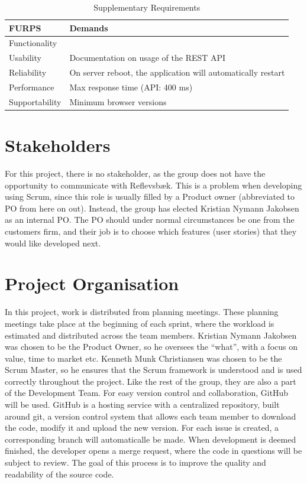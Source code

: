 \begin{table}[ht]
    \begin{tabularx}{\textwidth}{|>{\RaggedRight}p{4cm}|>{\RaggedRight}X|}
        \hline
        \textbf{FURPS}  & \textbf{Demands} \\
        \hline
        Functionality  	&  \\
        \hline
        Usability      	& Documentation on usage of the REST API \\
        \hline
        Reliability    	& On server reboot, the application will automatically restart \\
        \hline
        Performance    	& Max response time (API: 400 ms) \\
        \hline
        Supportability 	& Minimum browser versions \\
        \hline
    \end{tabularx}
    \caption{Supplementary Requirements} 
    \label{table:Sup_requirements}
\end{table} 

\section{Stakeholders}
For this project, there is no stakeholder, as the group does not have the
opportunity to communicate with Reflevsbæk. This is a problem when developing
using Scrum, since this role is usually filled by a Product owner (abbreviated
to PO from here on out). Instead, the group has elected Kristian Nymann 
Jakobsen as an internal PO. The PO should under normal circumstances be one
from the customers firm, and their job is to choose which features (user
stories) that they would like developed next.

\section{Project Organisation}
In this project, work is distributed from planning meetings. These planning
meetings take place at the beginning of each sprint, where the workload is
estimated and distributed across the team members. Kristian Nymann Jakobsen was
chosen to be the Product Owner, so he oversees the “what”, with a focus on
value, time to market etc. Kenneth Munk Christiansen was chosen to be the Scrum
Master, so he ensures that the Scrum framework is understood and is used 
correctly throughout the project. Like the rest of the group, they are also a 
part of the Development Team. For easy version control and collaboration,
GitHub will be used. GitHub is a hosting service with a centralized repository,
built around git, a version control system that allows each team member to
download the code, modify it and upload the new version. For each issue is
created, a corresponding branch will automaticalle be made. When development
is deemed finished, the developer opens a merge request, where the code in
questions will be subject to review. The goal of this process is to improve
the quality and readability of the source code.

